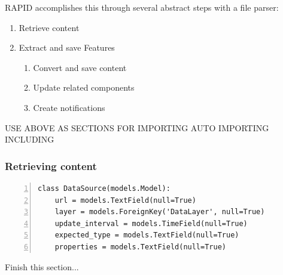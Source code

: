 
RAPID accomplishes this through several abstract steps with a file parser:

 \begin{enumerate}
   \item Retrieve content
   \item Extract and save Features
   \begin{enumerate}
     \item Convert and save content
     \item Update related components
     \item Create notifications
   \end{enumerate}
 \end{enumerate}
 
 USE ABOVE AS SECTIONS FOR IMPORTING
 AUTO IMPORTING INCLUDING
 
 \subsubsection{Retrieving content}
 
\begin{Verbatim}[samepage=true,baselinestretch=1,numbers=left,xleftmargin=12mm]
class DataSource(models.Model):
    url = models.TextField(null=True)
    layer = models.ForeignKey('DataLayer', null=True)
    update_interval = models.TimeField(null=True)
    expected_type = models.TextField(null=True)
    properties = models.TextField(null=True)
\end{Verbatim}
 
 
 Finish this section...
 
